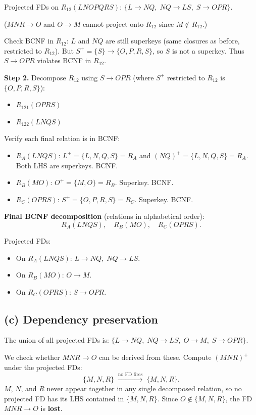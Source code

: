 \documentclass[11pt]{article}
\begin{document}
Projected FDs on $R_{12}(LNOPQRS)$:
$\{L \to NQ,\; NQ \to LS,\; S \to OPR\}$.

($MNR \to O$ and $O \to M$ cannot project onto $R_{12}$ since $M \notin R_{12}$.)

Check BCNF in $R_{12}$: $L$ and $NQ$ are still superkeys (same closures
as before, restricted to $R_{12}$). But
$S^+ = \{S\} \to \{O,P,R,S\}$, so $S$ is not a superkey.
Thus $S \to OPR$ violates BCNF in $R_{12}$.

\medskip
\textbf{Step 2.} Decompose $R_{12}$ using $S \to OPR$
(where $S^+$ restricted to $R_{12}$ is $\{O,P,R,S\}$):
\begin{itemize}
\item $R_{121}(OPRS)$
\item $R_{122}(LNQS)$
\end{itemize}

Verify each final relation is in BCNF:
\begin{itemize}
\item $R_A(LNQS)$: $L^+ = \{L,N,Q,S\} = R_A$ and
      $(NQ)^+ = \{L,N,Q,S\} = R_A$. Both LHS are superkeys. BCNF.
\item $R_B(MO)$: $O^+ = \{M,O\} = R_B$. Superkey. BCNF.
\item $R_C(OPRS)$: $S^+ = \{O,P,R,S\} = R_C$. Superkey. BCNF.
\end{itemize}

\textbf{Final BCNF decomposition}
(relations in alphabetical order):
\[
R_A(LNQS),\quad R_B(MO),\quad R_C(OPRS).
\]

Projected FDs:
\begin{itemize}
\item On $R_A(LNQS)$: $L \to NQ,\; NQ \to LS$.
\item On $R_B(MO)$: $O \to M$.
\item On $R_C(OPRS)$: $S \to OPR$.
\end{itemize}

\subsection*{(c) Dependency preservation}

The union of all projected FDs is:
$\{L \to NQ,\; NQ \to LS,\; O \to M,\; S \to OPR\}$.

We check whether $MNR \to O$ can be derived from these.
Compute $(MNR)^+$ under the projected FDs:
\[
\{M,N,R\}
  \;\xrightarrow{\text{no FD fires}}\;
  \{M,N,R\}.
\]
$M$, $N$, and $R$ never appear together in any single decomposed relation,
so no projected FD has its LHS contained in $\{M,N,R\}$.
Since $O \notin \{M,N,R\}$, the FD $MNR \to O$ is \textbf{lost}.
\end{document}
